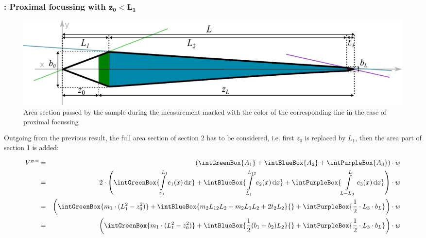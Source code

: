 \subsubsection*{\Vgeo: Proximal focussing with $\bm{z_0 < L_1}$}
\begin{figure}[h]
  \begin{center}
    \includegraphics[width=0.95\linewidth]{./images/fffVolume2.pdf}    
  \end{center}
  \vspace*{-3ex}    
  \caption[Passed area section - proximal focussing]{Area section passed by the sample during the measurement marked 
  with the color of the corresponding line in the case of proximal focussing}
  \label{fig:fffVolume2} 
\end{figure}
Outgoing from the previous result, the full area section of section 2 has to be considered, i.e. first $z_0$ is 
replaced by $L_1$, then the area part of section 1 is added:

\begin{align}
  \Vgeo & = &\left( \intGreenBox{\ensuremath{A_1}} +  \intBlueBox{\ensuremath{A_2}} + \intPurpleBox{\ensuremath{A_3}}\right) \cdot w\nonumber \\  
        & =&2 \cdot \left(
             \intGreenBox {\ensuremath{ \int\limits_{z_0}^{L_{1}} e_1(x) \diff x }}
             + \intBlueBox {\ensuremath{ \int\limits_{L_1}^{L_{12}} e_2(x) \diff x }}
             + \intPurpleBox{\ensuremath{  \int\limits_{L-L_3}^{L} e_3(x) \diff x }}    
             \right) \cdot w \nonumber \\
        &  =&\left(
              \intGreenBox {\ensuremath{ m_1 \cdot ( L_1^2 - z_0^2) }}
              + \intBlueBox{\ensuremath{ m_2L_{12}L_2 + m_2L_1L_2 + 2t_2L_2}}{ }
              + \intPurpleBox{\ensuremath{ \frac{1}{2} \cdot L_3 \cdot \bL  } }
              \right) \cdot w   \nonumber\\
        &  =&\left(
              \intGreenBox {\ensuremath{ m_1 \cdot ( L_1^2 - z_0^2) }}
              + \intBlueBox{\ensuremath{   \frac{1}{2} (b_1 + b_2) L_2  }  }{ }
              + \intPurpleBox{\ensuremath{ \frac{1}{2} \cdot L_3 \cdot \bL  } }
              \right) \cdot w         
              \label{eq:proxFocusVolume}
\end{align}